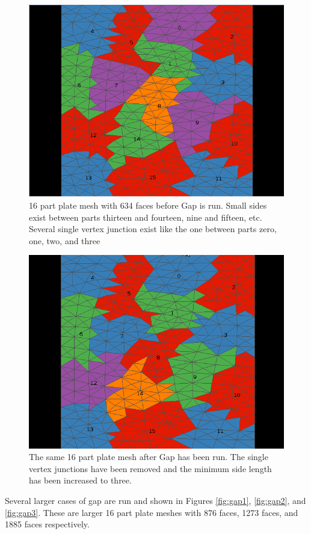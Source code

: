 \documentclass{thesis}
\begin{document}
\begin{figure} [!hp]
\centering
\captionsetup{justification=centering,margin=1cm}
\includegraphics[width=.6\textwidth]{results_before.png}
\caption{\label{fig:plate} \textnormal{16 part plate mesh with 634 faces before Gap is run. Small sides exist between parts thirteen and fourteen, nine and fifteen, etc. Several single vertex junction exist like the one between parts zero, one, two, and three}}
\end{figure}

\begin{figure} [!hp]
\centering
\captionsetup{justification=centering,margin=1cm}
\includegraphics[width=.6\textwidth]{results_after.png}
\caption{\label{fig:plate_gap} \textnormal{The same 16 part plate mesh after Gap has been run. The single vertex junctions have been removed and the minimum side length has been increased to three.}}
\end{figure}

Several larger cases of gap are run and shown in Figures \ref{fig:gap1}, \ref{fig:gap2}, and \ref{fig:gap3}. These are larger 16 part plate meshes with 876 faces, 1273 faces, and 1885 faces respectively.  
\end{document}
